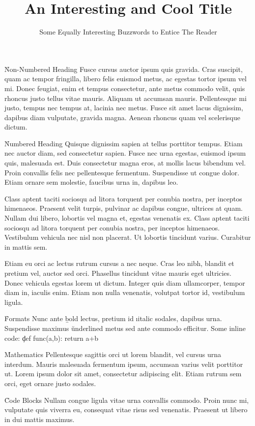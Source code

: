 \documentclass[twocolumn]{paper}
\title    {An Interesting and Cool Title}
\subtitle {Some Equally Interesting Buzzwords to Entice The Reader}
\begin{document}
\h*{Non-Numbered Heading}
Fusce cursus auctor ipsum quis gravida. Cras suscipit, quam ac tempor fringilla, libero felis euismod metus, ac egestas tortor ipsum vel mi. Donec feugiat, enim et tempus consectetur, ante metus commodo velit, quis rhoncus justo tellus vitae mauris. Aliquam ut accumsan mauris. Pellentesque mi justo, tempus nec tempus at, lacinia nec metus. Fusce sit amet lacus dignissim, dapibus diam vulputate, gravida magna. Aenean rhoncus quam vel scelerisque dictum.

\h{Numbered Heading}
Quisque dignissim sapien at tellus porttitor tempus. Etiam nec auctor diam, sed consectetur sapien. Fusce nec urna egestas, euismod ipsum quis, malesuada est. Duis consectetur magna eros, at mollis lacus bibendum vel. Proin convallis felis nec pellentesque fermentum. Suspendisse ut congue dolor. Etiam ornare sem molestie, faucibus urna in, dapibus leo.

Class aptent taciti sociosqu ad litora torquent per conubia nostra, per inceptos himenaeos. Praesent velit turpis, pulvinar ac dapibus congue, ultrices at quam. Nullam dui libero, lobortis vel magna et, egestas venenatis ex. Class aptent taciti sociosqu ad litora torquent per conubia nostra, per inceptos himenaeos. Vestibulum vehicula nec nisl non placerat. Ut lobortis tincidunt varius. Curabitur in mattis sem.

Etiam eu orci ac lectus rutrum cursus a nec neque. Cras leo nibh, blandit et pretium vel, auctor sed orci. Phasellus tincidunt vitae mauris eget ultricies. Donec vehicula egestas lorem ut dictum. Integer quis diam ullamcorper, tempor diam in, iaculis enim. Etiam non nulla venenatis, volutpat tortor id, vestibulum ligula.

\h{Formats}
Nunc ante \b{bold} lectus, pretium id \i{italic} sodales, dapibus  urna. Suspendisse maximus \u{underlined} metus sed ante commodo efficitur. Some inline code: \c{def func(a,b): return a+b}

\h{Mathematics}
Pellentesque sagittis orci ut lorem blandit, vel cursus urna interdum. Mauris malesuada fermentum ipsum, accumsan varius velit porttitor ut. Lorem ipsum dolor sit amet, consectetur adipiscing elit. Etiam rutrum sem orci, eget ornare justo sodales.


\h{Code Blocks}
Nullam congue ligula vitae urna convallis commodo. Proin nunc mi, vulputate quis viverra eu, consequat vitae risus sed venenatis. Praesent ut libero in dui mattis maximus.
\end{document}
